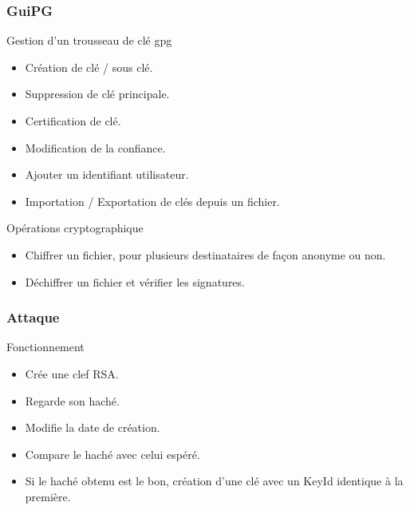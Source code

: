 \begin{frame}
  \frametitle{\color{white}GuiPG}
  \begin{block}{Gestion d'un trousseau de clé gpg}
      \begin{itemize}
        \item Création de clé / sous clé.
        \item Suppression de clé principale.
        \item Certification de clé.
        \item Modification de la confiance.
        \item Ajouter un identifiant utilisateur.
        \item Importation / Exportation de clés depuis un fichier.
      \end{itemize}
    \end{block}
    \begin{block}{Opérations cryptographique}
      \begin{itemize}
        \item Chiffrer un fichier, pour plusieurs destinataires de façon anonyme ou non.
        \item Déchiffrer un fichier et vérifier les signatures.
      \end{itemize}
    \end{block}
\end{frame}

\begin{frame}
  \frametitle{\color{white}Attaque}
  \begin{block}{Fonctionnement}
      \begin{itemize}
        \item Crée une clef RSA.
        \item Regarde son haché.
        \item Modifie la date de création.
        \item Compare le haché avec celui espéré.
        \item Si le haché obtenu est le bon, création d'une clé avec un KeyId identique à la première.
      \end{itemize}
    \end{block}
\end{frame}

